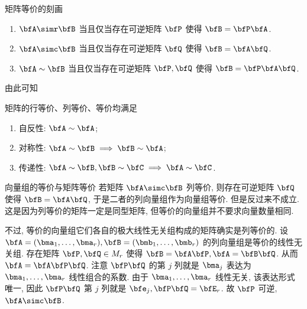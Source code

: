 \begin{frame}{矩阵等价的刻画}
	\onslide<+->
	\begin{theorem}
		\begin{enumerate}
			\item $\bfA\simr\bfB$ 当且仅当存在可逆矩阵 $\bfP$ 使得 $\bfB=\bfP\bfA$.
			\item $\bfA\simc\bfB$ 当且仅当存在可逆矩阵 $\bfQ$ 使得 $\bfB=\bfA\bfQ$.
			\item $\bfA\sim\bfB$ 当且仅当存在可逆矩阵 $\bfP,\bfQ$ 使得 $\bfB=\bfP\bfA\bfQ$.
		\end{enumerate}
	\end{theorem}
	\onslide<+->
	由此可知
	\begin{proposition}
		矩阵的行等价、列等价、等价均满足
		\begin{enumerate}
			\item 自反性: $\bfA\sim\bfA$;
			\item 对称性: $\bfA\sim\bfB\implies\bfB\sim\bfA$;
			\item 传递性: $\bfA\sim\bfB,\bfB\sim\bfC\implies\bfA\sim\bfC$.
		\end{enumerate}
	\end{proposition}
\end{frame}


\begin{frame}{向量组的等价与矩阵等价}
	\onslide<+->
	若矩阵 $\bfA\simc\bfB$ 列等价, 则存在可逆矩阵 $\bfQ$ 使得 $\bfB=\bfA\bfQ$,
	\onslide<+->
	于是二者的列向量组作为向量组等价.
	\onslide<+->
	但是反过来\alert{不成立}.
	\onslide<+->
	这是因为列等价的矩阵一定是同型矩阵, 但等价的向量组并不要求向量数量相同.

	\onslide<+->
	不过, 等价的向量组它们各自的极大线性无关组构成的矩阵确实是列等价的.
	\onslide<+->
	设 $\bfA=(\bma_1,\dots,\bma_r),\bfB=(\bmb_1,\dots,\bmb_r)$ 的列向量组是等价的线性无关组.
	\onslide<+->
	存在矩阵 $\bfP,\bfQ\in M_r$ 使得 $\bfB=\bfA\bfP,\bfA=\bfB\bfQ$.
	\onslide<+->
	从而 $\bfA=\bfA\bfP\bfQ$.
	\onslide<+->
	注意 $\bfP\bfQ$ 的第 $j$ 列就是 $\bma_j$ 表达为 $\bma_1,\dots,\bma_r$ 线性组合的系数.
	\onslide<+->
	由于 $\bma_1,\dots,\bma_r$ 线性无关, 该表达形式唯一, 因此 $\bfP\bfQ$ 第 $j$ 列就是 $\bfe_j, \bfP\bfQ=\bfE_r$.
	\onslide<+->
	故 $\bfP$ 可逆, $\bfA\simc\bfB$.
\end{frame}


